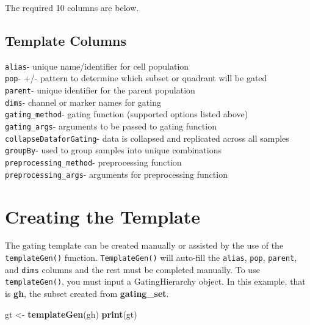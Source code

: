 \documentclass[]{book}
\newenvironment{Shaded}{\begin{snugshade}}{\end{snugshade}}
\newcommand{\KeywordTok}[1]{\textcolor[rgb]{0.13,0.29,0.53}{\textbf{#1}}}
\newcommand{\NormalTok}[1]{#1}
\newcommand{\StringTok}[1]{\textcolor[rgb]{0.31,0.60,0.02}{#1}}
\begin{document}
The required 10 columns are below.

\hypertarget{template-columns}{%
\subsection{Template Columns}\label{template-columns}}

\texttt{alias}- unique name/identifier for cell population\\
\texttt{pop}- +/- pattern to determine which subset or quadrant will be gated\\
\texttt{parent}- unique identifier for the parent population\\
\texttt{dims}- channel or marker names for gating\\
\texttt{gating\_method}- gating function (supported options listed above)\\
\texttt{gating\_args}- arguments to be passed to gating function
\texttt{collapseDataforGating}- data is collapsed and replicated across all samples\\
\texttt{groupBy}- used to group samples into unique combinations\\
\texttt{preprocessing\_method}- preprocessing function\\
\texttt{preprocessing\_args}- arguments for preprocessing function

\hypertarget{creating-the-template}{%
\section{Creating the Template}\label{creating-the-template}}

The gating template can be created manually or assisted by the use of the \texttt{templateGen()} function. \texttt{TemplateGen()} will auto-fill the \texttt{alias}, \texttt{pop}, \texttt{parent}, and \texttt{dims} columns and the rest must be completed manually. To use \texttt{templateGen()}, you must input a GatingHierarchy object. In this example, that is \textbf{gh}, the subset created from \textbf{gating\_set}.

\begin{Shaded}
\begin{Highlighting}[]
\NormalTok{gt <-}\StringTok{ }\KeywordTok{templateGen}\NormalTok{(gh)}
\KeywordTok{print}\NormalTok{(gt)}
\end{Highlighting}
\end{Shaded}
\end{document}
